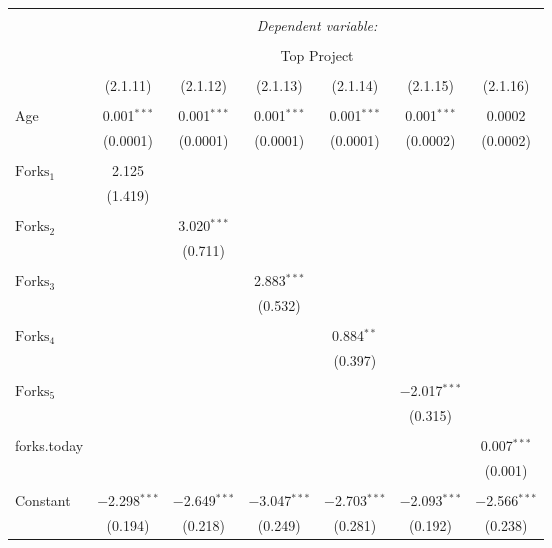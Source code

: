 
\begin{tabular}{@{\extracolsep{5pt}}lcccccc}
\\[-1.8ex]\hline
\hline \\[-1.8ex]
 & \multicolumn{6}{c}{\textit{Dependent variable:}} \\
\cline{2-7}
\\[-1.8ex] & \multicolumn{6}{c}{Top Project} \\
\\[-1.8ex] & (2.1.11) & (2.1.12) & (2.1.13) & (2.1.14) & (2.1.15) & (2.1.16)\\ 
\hline \\[-1.8ex]
 Age & 0.001$^{***}$ & 0.001$^{***}$ & 0.001$^{***}$ & 0.001$^{***}$ & 0.001$^{***}$ & 0.0002 \\
  & (0.0001) & (0.0001) & (0.0001) & (0.0001) & (0.0002) & (0.0002) \\
  & & & & & & \\
 $\text{Forks}_{1}$ & 2.125 &  &  &  &  &  \\
  & (1.419) &  &  &  &  &  \\
  & & & & & & \\
 $\text{Forks}_{2}$ &  & 3.020$^{***}$ &  &  &  &  \\
  &  & (0.711) &  &  &  &  \\
  & & & & & & \\
 $\text{Forks}_{3}$ &  &  & 2.883$^{***}$ &  &  &  \\
  &  &  & (0.532) &  &  &  \\
  & & & & & & \\
 $\text{Forks}_{4}$ &  &  &  & 0.884$^{**}$ &  &  \\
  &  &  &  & (0.397) &  &  \\
  & & & & & & \\
 $\text{Forks}_{5}$ &  &  &  &  & $-$2.017$^{***}$ &  \\
  &  &  &  &  & (0.315) &  \\
  & & & & & & \\
 forks.today &  &  &  &  &  & 0.007$^{***}$ \\
  &  &  &  &  &  & (0.001) \\
  & & & & & & \\
 Constant & $-$2.298$^{***}$ & $-$2.649$^{***}$ & $-$3.047$^{***}$ & $-$2.703$^{***}$ & $-$2.093$^{***}$ & $-$2.566$^{***}$ \\
  & (0.194) & (0.218) & (0.249) & (0.281) & (0.192) & (0.238) \\

\end{tabular}
